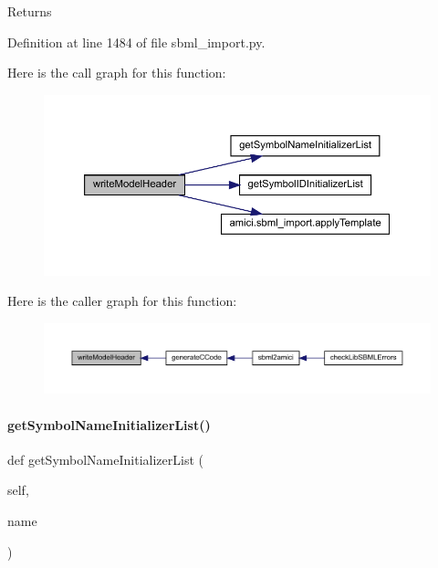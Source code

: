\begin{DoxyReturn}{Returns}

\end{DoxyReturn}


Definition at line 1484 of file sbml\+\_\+import.\+py.

Here is the call graph for this function\+:
\nopagebreak
\begin{figure}[H]
\begin{center}
\leavevmode
\includegraphics[width=350pt]{classamici_1_1sbml__import_1_1_sbml_importer_aa549fe60f186fefb87b71a2461b0a270_cgraph}
\end{center}
\end{figure}
Here is the caller graph for this function\+:
\nopagebreak
\begin{figure}[H]
\begin{center}
\leavevmode
\includegraphics[width=350pt]{classamici_1_1sbml__import_1_1_sbml_importer_aa549fe60f186fefb87b71a2461b0a270_icgraph}
\end{center}
\end{figure}
\mbox{\label{classamici_1_1sbml__import_1_1_sbml_importer_a1280dbd6e4ab980a25798bf8d88670b9}} 
\paragraph{\texorpdfstring{get\+Symbol\+Name\+Initializer\+List()}{getSymbolNameInitializerList()}}
{\footnotesize\ttfamily def get\+Symbol\+Name\+Initializer\+List (\begin{DoxyParamCaption}\item[{}]{self,  }\item[{}]{name }\end{DoxyParamCaption})}


